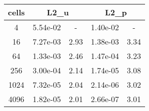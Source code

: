 \documentclass[10pt]{report}
\begin{document}
\begin{table}[H]
\begin{center}
\begin{tabular}{|c|c|c|c|c|} \hline
cells & 
\multicolumn{2}{|c|}{L2_u} & 
\multicolumn{2}{|c|}{L2_p}\\ \hline
4 & 5.54e-02 & - & 1.40e-02 & -\\ \hline
16 & 7.27e-03 & 2.93 & 1.38e-03 & 3.34\\ \hline
64 & 1.33e-03 & 2.46 & 1.47e-04 & 3.23\\ \hline
256 & 3.00e-04 & 2.14 & 1.74e-05 & 3.08\\ \hline
1024 & 7.32e-05 & 2.04 & 2.14e-06 & 3.02\\ \hline
4096 & 1.82e-05 & 2.01 & 2.66e-07 & 3.01\\ \hline
\end{tabular}
\end{center}
\end{table}
\end{document}
